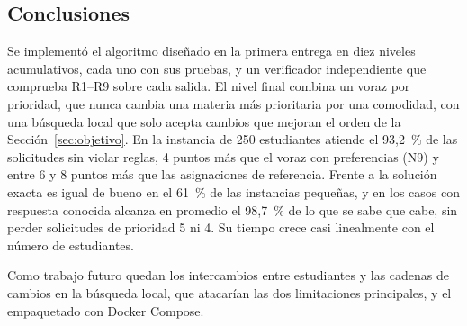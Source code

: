 \subsection{Conclusiones}\label{sec:conclusiones}

Se implementó el algoritmo diseñado en la primera entrega en diez niveles acumulativos, cada uno con sus pruebas, y un verificador independiente que comprueba R1--R9 sobre cada salida. El nivel final combina un voraz por prioridad, que nunca cambia una materia más prioritaria por una comodidad, con una búsqueda local que solo acepta cambios que mejoran el orden de la Sección~\ref{sec:objetivo}. En la instancia de 250 estudiantes atiende el 93,2~\% de las solicitudes sin violar reglas, 4 puntos más que el voraz con preferencias (N9) y entre 6 y 8 puntos más que las asignaciones de referencia. Frente a la solución exacta es igual de bueno en el 61~\% de las instancias pequeñas, y en los casos con respuesta conocida alcanza en promedio el 98,7~\% de lo que se sabe que cabe, sin perder solicitudes de prioridad 5 ni 4. Su tiempo crece casi linealmente con el número de estudiantes.

Como trabajo futuro quedan los intercambios entre estudiantes y las cadenas de cambios en la búsqueda local, que atacarían las dos limitaciones principales, y el empaquetado con Docker Compose.
